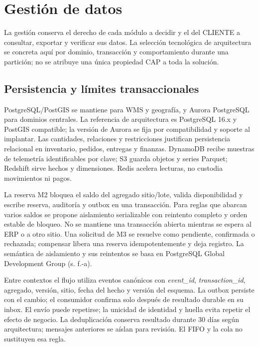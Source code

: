 \section{Gestión de datos}
\label{sec:5-gestion}
La gestión conserva el derecho de cada módulo a decidir y el del CLIENTE a consultar, exportar y verificar sus datos. La selección tecnológica de arquitectura se concreta aquí por dominio, transacción y comportamiento durante una partición; no se atribuye una única propiedad CAP a toda la solución.

\subsection{Persistencia y límites transaccionales}
PostgreSQL/PostGIS se mantiene para WMS y geografía, y Aurora PostgreSQL para dominios centrales. La referencia de arquitectura es PostgreSQL 16.x y PostGIS compatible; la versión de Aurora se fija por compatibilidad y soporte al implantar. Las cantidades, relaciones y restricciones justifican persistencia relacional en inventario, pedidos, entregas y finanzas. DynamoDB recibe muestras de telemetría identificables por clave; S3 guarda objetos y series Parquet; Redshift sirve hechos y dimensiones. Redis acelera lecturas, no custodia movimientos ni pagos.

La reserva M2 bloquea el saldo del agregado sitio/lote, valida disponibilidad y escribe reserva, auditoría y outbox en una transacción. Para reglas que abarcan varios saldos se propone aislamiento serializable con reintento completo y orden estable de bloqueo. No se mantiene una transacción abierta mientras se espera al ERP o a otro sitio. Una solicitud de M3 se resuelve como pendiente, confirmada o rechazada; compensar libera una reserva idempotentemente y deja registro. La semántica de aislamiento y sus reintentos se basa en PostgreSQL Global Development Group (s. f.-a).

Entre contextos el flujo utiliza eventos canónicos con \emph{event\_id}, \emph{transaction\_id}, agregado, versión, sitio, fecha del hecho y versión del esquema. La outbox persiste con el cambio; el consumidor confirma solo después de resultado durable en su inbox. El envío puede repetirse; la unicidad de identidad y huella evita repetir el efecto de negocio. La deduplicación conserva resultado durante 30 días según arquitectura; mensajes anteriores se aíslan para revisión. El FIFO y la cola no sustituyen esa regla.

